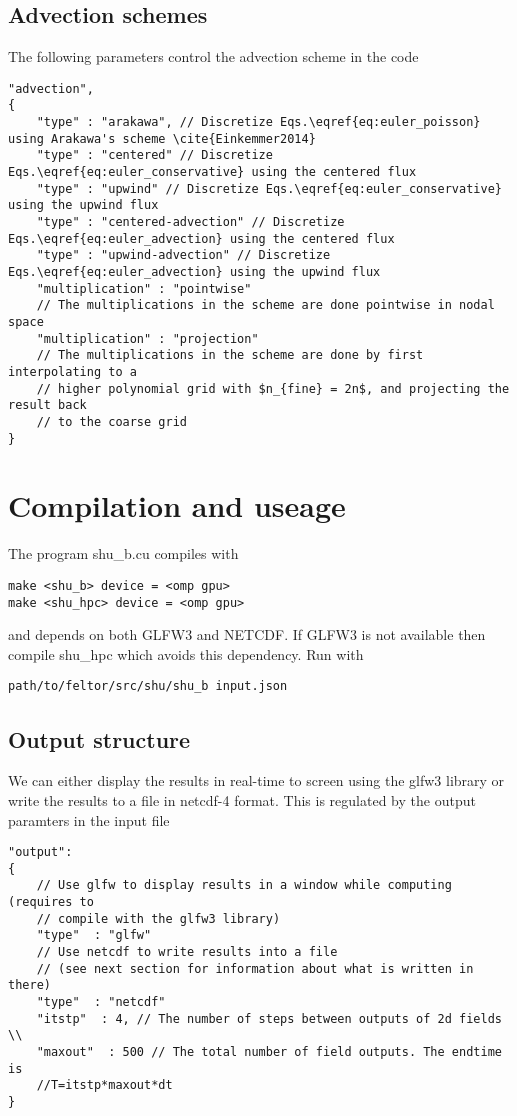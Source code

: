 \subsection{Advection schemes}
The following parameters control the advection scheme in the code
\begin{verbatim}
"advection",
{
    "type" : "arakawa", // Discretize Eqs.\eqref{eq:euler_poisson} using Arakawa's scheme \cite{Einkemmer2014}
    "type" : "centered" // Discretize Eqs.\eqref{eq:euler_conservative} using the centered flux
    "type" : "upwind" // Discretize Eqs.\eqref{eq:euler_conservative} using the upwind flux
    "type" : "centered-advection" // Discretize Eqs.\eqref{eq:euler_advection} using the centered flux
    "type" : "upwind-advection" // Discretize Eqs.\eqref{eq:euler_advection} using the upwind flux
    "multiplication" : "pointwise"
    // The multiplications in the scheme are done pointwise in nodal space
    "multiplication" : "projection"
    // The multiplications in the scheme are done by first interpolating to a
    // higher polynomial grid with $n_{fine} = 2n$, and projecting the result back
    // to the coarse grid
}
\end{verbatim}

\section{Compilation and useage}
The program shu\_b.cu compiles with
\begin{verbatim}
make <shu_b> device = <omp gpu>
make <shu_hpc> device = <omp gpu>
\end{verbatim}
and depends on both GLFW3 and NETCDF. If GLFW3 is not available then compile shu\_hpc which avoids this dependency.
Run with
\begin{verbatim}
path/to/feltor/src/shu/shu_b input.json
\end{verbatim}

\subsection{Output structure}

We can either display the results in real-time to screen using the glfw3 library or
write the results to a file in netcdf-4 format.
This is regulated by the output paramters in the input file
\begin{verbatim}
"output":
{
    // Use glfw to display results in a window while computing (requires to
    // compile with the glfw3 library)
    "type"  : "glfw"
    // Use netcdf to write results into a file
    // (see next section for information about what is written in there)
    "type"  : "netcdf"
    "itstp"  : 4, // The number of steps between outputs of 2d fields \\
    "maxout"  : 500 // The total number of field outputs. The endtime is
    //T=itstp*maxout*dt
}
\end{verbatim}
